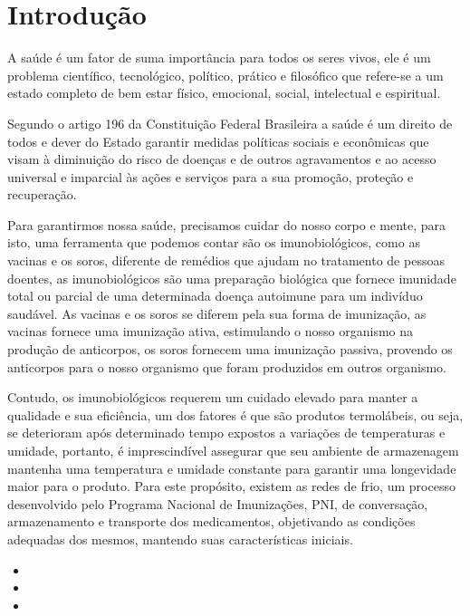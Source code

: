 \chapter[Introdução]{Introdução}
\label{cap:intro}

A saúde é um fator de suma importância para todos os seres vivos, ele é um problema científico, tecnológico, político, prático e filosófico que refere-se a um estado completo de bem estar físico, emocional, social, intelectual e espiritual\cite{almeida2011saude}. 

Segundo o artigo 196 da Constituição Federal Brasileira a saúde é um direito de todos e dever do Estado garantir medidas políticas sociais e econômicas que visam à diminuição do risco de doenças e de outros agravamentos e ao acesso universal e imparcial às ações e serviços para a sua promoção, proteção e recuperação\cite{de2013direito}.

Para garantirmos nossa saúde, precisamos cuidar do nosso corpo e mente, para isto, uma ferramenta que podemos contar são os imunobiológicos, como as vacinas e os soros, diferente de remédios que ajudam no tratamento de pessoas doentes, as imunobiológicos são uma preparação biológica que fornece imunidade total ou parcial de uma determinada doença autoimune para um indivíduo saudável. As vacinas e os soros se diferem pela sua forma de imunização, as vacinas fornece uma imunização ativa, estimulando o nosso organismo na produção de anticorpos, os soros fornecem uma imunização passiva, provendo os anticorpos para o nosso organismo que foram produzidos  em outros organismo\cite{soma2018tratamento}.

Contudo, os imunobiológicos requerem um cuidado elevado para manter a qualidade e sua eficiência, um dos fatores é que são produtos termolábeis, ou seja, se deterioram após determinado tempo expostos a variações de temperaturas e umidade, portanto, é imprescindível assegurar que seu ambiente de armazenagem mantenha uma temperatura e umidade constante\cite{ministerio2001manual} para garantir uma longevidade maior para o produto. Para este propósito, existem as redes de frio, um processo desenvolvido pelo Programa Nacional de Imunizações, PNI, de conversação, armazenamento e transporte dos medicamentos, objetivando as condições adequadas dos mesmos, mantendo suas características iniciais\cite{ministerio2001manual}.

\begin{itemize}
  \item {}
  \item {}
  \item {}
\end{itemize}

